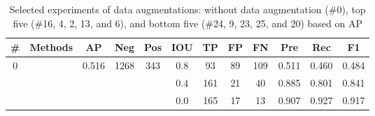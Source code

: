 \documentclass[preprint,12pt,authoryear]{elsarticle}
\begin{document}
\begin{table}
\footnotesize
\caption{Selected experiments of data augmentations: without data augmentation (\#0), top five (\#16, 4, 2, 13, and 6), and bottom five (\#24, 9, 23, 25, and 20) based on AP}
\label{table_acc_imgaug}
\begin{tabular}{c c c c  c ccc c c c c}
\toprule
\textbf{\#}&\textbf{Methods}&\textbf{AP}&\textbf{Neg}&\textbf{Pos}&\textbf{IOU}&\textbf{TP}&\textbf{FP}&\textbf{FN}&\textbf{Pre}&\textbf{Rec}&\textbf{F1} \\
\midrule

\multirow{3}{*}{0} &  \multirow{3}{*}{} & \multirow{3}{*}{0.516} & \multirow{3}{*}{1268} & \multirow{3}{*}{343} &0.8 & 93	&89	&109&	0.511 &	0.460& 	0.484  \\
 &  & &  &   & 0.4 & 161&	21	&40	&0.885 &	0.801 &	0.841  \\
 &  & &  &   & 0.0 & 165&	17	&13&	0.907 	&0.927 	&0.917  \\

\hline
\hline


\end{tabular}
\end{table}
\end{document}
